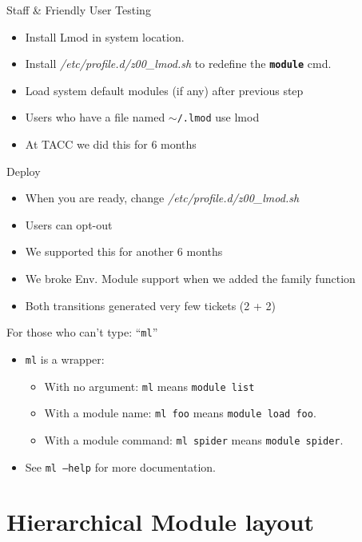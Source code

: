 \documentclass{beamer}
\begin{document}
\begin{frame}{Staff \& Friendly User Testing}
  \begin{itemize}
    \item Install Lmod in system location.
    \item Install \emph{/etc/profile.d/z00\_lmod.sh} to redefine the
      \texttt{\bf module} cmd.
    \item Load system  default modules (if any) after previous step
    \item Users who have a file named \texttt{$\sim$/.lmod} use lmod
    \item At TACC we did this for 6 months
  \end{itemize}
\end{frame}

\begin{frame}{Deploy}
  \begin{itemize}
    \item When you are ready, change \emph{/etc/profile.d/z00\_lmod.sh}
    \item Users can opt-out
    \item We supported this for another 6 months
    \item We broke Env. Module support when we added the family function
    \item Both transitions generated very few tickets (2 + 2)
  \end{itemize}
\end{frame}

\begin{frame}{For those who can't type: ``\texttt{ml}''}
  \begin{itemize}
    \item \texttt{ml} is a wrapper:
      \begin{itemize}
        \item With no argument: \texttt{ml} means \texttt{module list}
        \item With a module name: \texttt{ml foo} means \texttt{module
            load foo}.
        \item With a module command: \texttt{ml spider} means
          \texttt{module spider}.
      \end{itemize}
    \item See \texttt{ml --help} for more documentation.
  \end{itemize}
\end{frame}

\section{Hierarchical Module layout}
\end{document}
